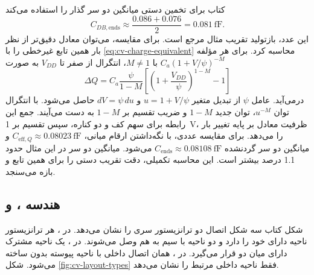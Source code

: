 کتاب برای تخمین دستی میانگین دو سر گذار را استفاده می‌کند
\begin{equation*}
 C_{DB,\mathrm{ends}}\approx\frac{0.086+0.076}{2}
 =\qty{0.081}{\femto\farad}.
\end{equation*}
این عدد، بازتولید تقریب مثال مرجع است. برای مقایسه، می‌توان معادل دقیق‌تر از
نظر بار همین تابع غیرخطی را با \eqref{eq:cv-charge-equivalent} محاسبه کرد.
برای هر مؤلفه \(C_a(1+V/\psi)^{-M}\) با \(M\ne1\)، انتگرال از صفر تا
\(V_{DD}\) به صورت
\begin{equation}
 \Delta Q=C_a\frac{\psi}{1-M}
 \left[\left(1+\frac{V_{DD}}{\psi}\right)^{1-M}-1\right]
 \label{eq:cv-junction-integral}
\end{equation}
درمی‌آید. عامل \(\psi\) از تبدیل متغیر \(u=1+V/\psi\) و
\(dV=\psi\,du\) حاصل می‌شود. با انتگرال توان \(u^{-M}\)، توان جدید
\(1-M\) و ضریب تقسیم بر \(1-M\) به دست می‌آیند.
جمع این رابطه برای سهم کف و دو کناره، سپس تقسیم بر \qty{1}{\volt}، ظرفیت
معادل بر پایه تغییر بار را می‌دهد. برای مقایسه عددی، با نگه‌داشتن ارقام میانی،
\(C_{\mathrm{eff},Q}\approx\qty{0.08023}{\femto\farad}\) و میانگین دو سر
گردنشده \(C_{\mathrm{ends}}\approx\qty{0.08108}{\femto\farad}\) می‌شود.
میانگین دو سر در این مثال حدود \num{1.1} درصد بیشتر است.
این محاسبه تکمیلی، دقت تقریب دستی را برای همین تابع و بازه می‌سنجد.

\subsection{هندسه ،  و }
شکل  کتاب سه شکل اتصال دو ترانزیستور سری را نشان می‌دهد.
در ، هر ترانزیستور ناحیه دارای  خود را دارد
و دو ناحیه با سیم به هم وصل می‌شوند. در ، یک ناحیه مشترک
دارای  میان دو  قرار می‌گیرد.
در ، همان اتصال داخلی با ناحیه پیوسته بدون 
ساخته می‌شود. شکل \ref{fig:cv-layout-types} فقط ناحیه داخلی مرتبط را نشان می‌دهد.

